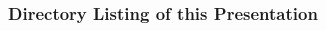 \begin{frame}
\frametitle{Directory Listing of this Presentation}
\vspace{-1em}
\hfill 
\begin{minipage}{.9\linewidth}
\begin{multicols}{3}
\begin{Tiny}

\end{Tiny}
\end{multicols}
\end{minipage}
\hfill
\end{frame}
